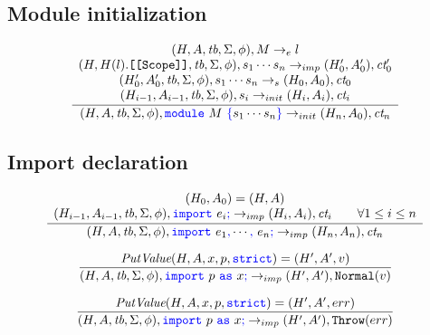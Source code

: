 \documentclass[a4paper]{article}
\newcommand{\code}[1]{\textcolor{blue}{\tt #1}}
\newcommand{\tb}{\emph{tb}}
\newcommand{\ct}{\emph{ct}}
\begin{document}
\subsection{Module initialization}

\begin{equation*}
\frac{
    \begin{array}{c}
    (H, A, \tb, \Sigma, \phi), M \rightarrow_e l \\
    (H, H(l).\texttt{[[Scope]]}, \tb, \Sigma, \phi), s_1 \cdots s_n \rightarrow_{imp} (H'_0, A'_0), \ct'_0 \\
    (H'_0, A'_0, \tb, \Sigma, \phi), s_1 \cdots s_n \rightarrow_s (H_0, A_0), \ct_0 \\
    (H_{i-1}, A_{i-1}, \tb, \Sigma, \phi), s_i \rightarrow_{init} (H_i, A_i), \ct_i \\
    \end{array}
}{
    (H, A, \tb, \Sigma, \phi), \code{module}\ M\ \code{\{} s_1 \cdots s_n \code{\}} \rightarrow_{init} (H_n, A_0), \ct_n
}
\end{equation*}

\subsection{Import declaration}

\begin{equation*}
\frac{
    \begin{array}{c}
    (H_0, A_0) = (H, A) \\
    (H_{i-1}, A_{i-1}, \tb, \Sigma, \phi), \code{import}\ e_i\code{;} \rightarrow_{imp} (H_i, A_i), \ct_i \qquad \forall 1 \le i \le n
    \end{array}
}{
    (H, A, \tb, \Sigma, \phi), \code{import}\ e_1\code{,} \cdots \code{,}\ e_n\code{;} \rightarrow_{imp} (H_n, A_n), \ct_n
}
\end{equation*}

\begin{equation*}
\frac{
    \emph{PutValue} (H, A, x, p, \code{strict}) = (H', A', v)
}{
    (H, A, \tb, \Sigma, \phi), \code{import}\ p\ \code{as}\ x\code{;} \rightarrow_{imp} (H', A'), \texttt{Normal} (v)
}
\end{equation*}

\begin{equation*}
\frac{
    \emph{PutValue} (H, A, x, p, \code{strict}) = (H', A', err)
}{
    (H, A, \tb, \Sigma, \phi), \code{import}\ p\ \code{as}\ x\code{;} \rightarrow_{imp} (H', A'), \texttt{Throw} (err)
}
\end{equation*}
\end{document}
